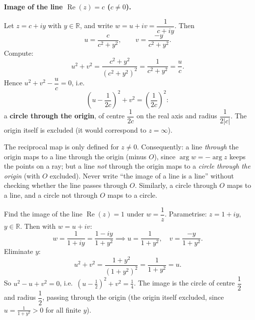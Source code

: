 \documentclass[11pt]{article}
\begin{document}
\textbf{Image of the line $\operatorname{Re}(z) = c$ ($c \neq 0$).}\par
Let $z = c + iy$ with $y \in \mathbb{R}$, and write $w = u + iv = \dfrac{1}{c + iy}$. Then
\[ u = \frac{c}{c^2 + y^2}, \qquad v = \frac{-y}{c^2 + y^2}. \]
Compute:
\[ u^2 + v^2 = \frac{c^2 + y^2}{(c^2 + y^2)^2} = \frac{1}{c^2 + y^2} = \frac{u}{c}. \]
Hence $u^2 + v^2 - \dfrac{u}{c} = 0$, i.e.
\[ \left(u - \frac{1}{2c}\right)^2 + v^2 = \left(\frac{1}{2c}\right)^2 : \]
a \textbf{circle through the origin}, of centre $\dfrac{1}{2c}$ on the real axis and radius $\dfrac{1}{2|c|}$. The origin itself is excluded (it would correspond to $z = \infty$).

\begin{attention}[$w = 1/z$ is undefined at $z = 0$]
The reciprocal map is only defined for $z \neq 0$. Consequently: a line \emph{through} the origin maps to a line through the origin (minus $O$), since $\arg w = -\arg z$ keeps the points on a ray; but a line \emph{not} through the origin maps to a \emph{circle through the origin} (with $O$ excluded). Never write ``the image of a line is a line'' without checking whether the line passes through $O$. Similarly, a circle through $O$ maps to a line, and a circle not through $O$ maps to a circle.
\end{attention}

\begin{exoresolu}[Image of $\operatorname{Re}(z) = 1$ under $w = 1/z$]
Find the image of the line $\operatorname{Re}(z) = 1$ under $w = \dfrac{1}{z}$.
\tcblower
Parametrise: $z = 1 + iy$, $y \in \mathbb{R}$. Then with $w = u + iv$:
\[ w = \frac{1}{1 + iy} = \frac{1 - iy}{1 + y^2} \implies u = \frac{1}{1+y^2},\quad v = \frac{-y}{1+y^2}. \]
Eliminate $y$:
\[ u^2 + v^2 = \frac{1 + y^2}{(1+y^2)^2} = \frac{1}{1+y^2} = u. \]
So $u^2 - u + v^2 = 0$, i.e.\ $\left(u - \tfrac12\right)^2 + v^2 = \tfrac14$. The image is the circle of centre $\dfrac{1}{2}$ and radius $\dfrac{1}{2}$, passing through the origin (the origin itself excluded, since $u = \frac{1}{1+y^2} > 0$ for all finite $y$).
\end{exoresolu}
\end{document}
